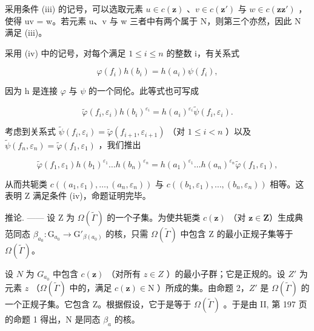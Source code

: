 采用条件 (iii) 的记号，可以选取元素 \(u \in c(\mathbf{z})\) 、\(v \in c(\mathbf{z}')\) 与 \(w \in c(\mathbf{z}\mathbf{z}')\) ，使得 uv = w。若元素 u、v 与 w 三者中有两个属于 N，则第三个亦然，因此 N 满足 (iii)。

采用 (iv) 中的记号，对每个满足 \(1 \leqslant i \leqslant n\) 的整数 i，有关系式

\[
  \varphi (f _ {i}) h (b _ {i}) = h (a _ {i}) \psi (f _ {i}),
\]

因为 h 是连接 \(\varphi\) 与 \(\psi\) 的一个同伦。此等式也可写成

\[
\widetilde {\varphi} (f _ {i}, \varepsilon_ {i}) h (b _ {i}) ^ {\varepsilon_ {i}} = h (a _ {i}) ^ {\varepsilon_ {i}} \widetilde {\psi} (f _ {i}, \varepsilon_ {i}).
\]

考虑到关系式 \(\widetilde{\psi}(f_i,\varepsilon_i) = \widetilde{\varphi}(f_{i + 1},\varepsilon_{i + 1})\) （对 \(1\leqslant i <   n\) ）以及 \(\widetilde{\psi} (f_n,\varepsilon_n) = \widetilde{\varphi} (f_1,\varepsilon_1)\) ，我们推出

\[
\widetilde {\varphi} (f _ {1}, \varepsilon_ {1}) h (b _ {1}) ^ {\varepsilon_ {1}} \dots h (b _ {n}) ^ {\varepsilon_ {n}} = h (a _ {1}) ^ {\varepsilon_ {1}} \dots h (a _ {n}) ^ {\varepsilon_ {n}} \widetilde {\varphi} (f _ {1}, \varepsilon_ {1}),
\]

从而共轭类 \(c((a_{1},\varepsilon_{1}),\ldots,(a_{n},\varepsilon_{n}))\) 与 \(c((b_{1},\varepsilon_{1}),\ldots,(b_{n},\varepsilon_{n}))\) 相等。这表明 Z 满足条件 (iv)，命题证明完毕。

推论. —— 设 Z 为 \(\Omega(\widetilde{\Gamma})\) 的一个子集。为使共轭类 \(c(\mathbf{z})\) （对 \(\mathbf{z} \in \mathbf{Z}\)）生成典范同态 \(\beta_{a_0}: \mathrm{G}_{a_0} \to \mathrm{G}'_{\beta(a_0)}\) 的核，只需 \(\Omega(\widetilde{\Gamma})\) 中包含 Z 的最小正规子集等于 \(\Omega(\widetilde{\Gamma})\)。

设 \(N\) 为 \(G_{a_{0}}\) 中包含 \(c(\mathbf{z})\) （对所有 \(z \in Z\) ）的最小子群；它是正规的。设 \(Z'\) 为元素 \(z\) （\(\Omega(\widetilde{\Gamma})\) 中的，满足 \(c(\mathbf{z}) \in \mathrm{N}\) ）所成的集。由命题 2，\(Z'\) 是 \(\Omega(\widetilde{\Gamma})\) 的一个正规子集。它包含 Z。根据假设，它于是等于 \(\Omega(\widetilde{\Gamma})\) 。于是由 II, 第 197 页的命题 1 得出，N 是同态 \(\beta_{a}\) 的核。

